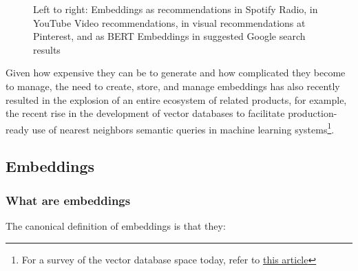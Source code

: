 \documentclass[draft, 11pt]{diazessay} %
\begin{document}
\begin{figure}[!ht]
\caption{Left to right: Embeddings as recommendations in Spotify Radio, in YouTube Video recommendations, in visual recommendations at Pinterest, and as BERT Embeddings in suggested Google search results}
\end{figure}

Given how expensive they can be to generate and how complicated they become to manage, the need to create, store, and manage embeddings has also recently resulted in the explosion of an entire ecosystem of related products, for example, the recent rise in the development of vector databases to facilitate production-ready use of nearest neighbors semantic queries in machine learning systems\footnote{For a survey of the vector database space today, refer to  \href{https://dmitry-kan.medium.com/landscape-of-vector-databases-d241b279f486}{this article}}.

\subsection{Embeddings}
 
\subsubsection{What are embeddings}
The canonical definition of embeddings is that they: 
\end{document}
